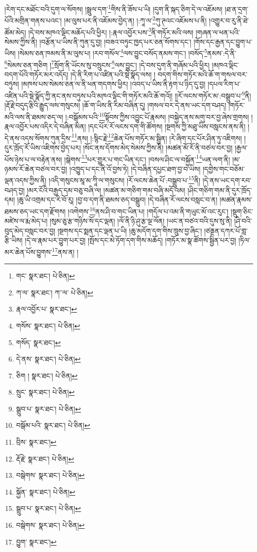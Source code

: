 །རེག་དང་མཐོང་བའི་དུག་ལ་སོགས། །སྦྲུལ་དག་\footnote{གང་  སྣར་ཐང་།  པེ་ཅིན། }གིས་ནི་ཟོས་པ་ཡི། །དུག་ནི་སྐད་ཅིག་དེ་ལ་འཇོམས། །ཐ་ན་དྲག་པོའི་མགྲིན་གནས་པའང་། །མ་ལུས་པར་ནི་འཇོམས་བྱེད་ན། །:ཀཱ་ལ་\footnote{ཀ་ལ་  སྣར་ཐང་། ཀ་་ལ་  པེ་ཅིན། }ཀུ་ཊའང་འཇོམས་པ་ནི། །འགྱུར་བ་རུ་ནི་ཐེ་ཚོམ་མེད། །དེ་བས་མཁའ་ལྡིང་མཆོད་པའི་ཕྱིར། །:རྣལ་འབྱོར་པས་\footnote{རྣལ་འབྱོར་པ་  སྣར་ཐང་། }ནི་གཏོར་མའི་ལས། །གཞན་ལ་ཕན་པའི་སེམས་ཀྱིས་ནི། །བརྩོན་པ་ཡིས་ནི་ཀུན་དུ་བྱ། །བཟའ་བཏུང་ཁྱད་པར་ཅན་སོགས་དང་། །གོས་དང་རྒྱན་དང་བྱུག་པ་ཡིས། །སེམས་ཅན་ཁམས་ནི་མ་ལུས་པ། །རབ་གསོལ་\footnote{གསོས་  སྣར་ཐང་།  པེ་ཅིན། }ལས་བྱུང་བསོད་ནམས་གང་། །བསོད་\footnote{གསོད་  སྣར་ཐང་། }ནམས་:དེ་ནི་\footnote{དེ་ནས་  སྣར་ཐང་།  པེ་ཅིན། }སེམས་ཅན་གཅིག །\footnote{ཅིག །  སྣར་ཐང་།  པེ་ཅིན། }སྲོག་ནི་ཡོངས་སུ་བསྲུངས་\footnote{སྲུང་  སྣར་ཐང་།  པེ་ཅིན། }ལས་བྱུང་། །དེ་བས་དུག་ནི་གཞོམ་པའི་ཕྱིར། །མཁའ་ལྡིང་བདག་པོའི་གཏོར་མར་འདོད། །དེ་ནི་རིག་པ་འཛིན་པའི་སྡེ་སྣོད་ལས། །
བདག་གིས་གཏོར་མའི་ཆོ་ག་གསལ་བར་བཏུས། །མཁས་པས་སེམས་ཅན་ལ་ནི་ཕན་གདགས་ཕྱིར། །འབད་པ་ཡིས་ནི་རྟག་པ་ཉིད་དུ་བྱ། །དཔལ་རིག་པ་འཛིན་པའི་སྡེ་སྣོད་ཀྱི་ནང་ནས་བཏུས་པའི་མཁའ་ལྡིང་གི་གཏོར་མའི་ཆོ་གའོ།། །།རོ་ལངས་གཏོར་མ་:བསྒྲུབ་པ་\footnote{སྒྲུབ་པ་  སྣར་ཐང་།  པེ་ཅིན། }ནི། །རྡོ་རྗེ་བདུད་རྩིའི་རྒྱུད་ལས་གསུངས། །ཆོ་ག་ཡིས་ནི་རིམ་བཞིན་དུ། །གསལ་བར་དེ་ནས་ཡང་དག་བཤད། །གཏོར་མའི་ལས་ནི་ཐམས་ཅད་ལ། །:བསྒོམས་པའི་\footnote{བསྒོམ་པའི་  སྣར་ཐང་།  པེ་ཅིན། }སྟོབས་ཀྱིས་འབྱུང་པོ་རྣམས། །བསྐྱེད་ནས་མགུ་བར་བྱ་ཞེས་གྲགས། །རྣལ་འབྱོར་པས་འདིར་དེ་བཞིན་མིན། །དང་པོར་རོ་ལངས་དག་གི་ཚོགས། །སྔགས་ཀྱི་མཐུ་ཡིས་བསླངས་ནས་ནི། །དེ་ནས་འདས་སོགས་ཀུན་དྲིས་\footnote{བྲིས་  སྣར་ཐང་། }ནས། །:སྙིང་རྗེ་\footnote{རྡོ་རྗེ་  སྣར་ཐང་།  པེ་ཅིན། }ཆེན་པོས་གཏོར་མ་སྦྱིན། །རེ་ཞིག་དང་པོར་ཤིན་ཏུ་འཇིགས། །དུར་ཁྲོད་རོ་ཡིས་འཇིགས་བྱེད་པར། །སོང་ནས་དོགས་མེད་སེམས་ཀྱིས་ནི། །མཚན་མོ་རོ་ནི་བཙལ་བར་བྱ། །རྒྱལ་པོས་ཉེས་པ་ལ་བརྟེན་ནས། །སྒེགས་\footnote{བསྒེགས་  སྣར་ཐང་།  པེ་ཅིན། }པར་གྱུར་པ་གང་ཡིན་དང་། །བསལ་ཤིང་ལ་བསྐྱོན་\footnote{སྐྱོན་  སྣར་ཐང་།  པེ་ཅིན། }ཡན་ལག་ནི། །མ་ཉམས་རོ་ཆེན་བཙལ་བར་བྱ། །འཁྱུད་པ་དང་ནི་འོ་བྱས་ཏེ། །དེ་བཞིན་དཔྱང་ཐག་བྱ་བ་ཡིས། །དགྱེས་གང་བཅོམ་ལྡན་འདས་ཀྱིས་ནི། །འདི་གསུངས་མཱ་མ་ཀཱི་ལ་གསུངས། །རོ་ལངས་ཆེན་པོ་:བསྒྲུབ་པ་\footnote{སྒྲུབ་པ་  སྣར་ཐང་།  པེ་ཅིན། }ནི། །དེ་ནས་ཡང་དག་རབ་བཤད་བྱ། །མར་ངོའི་བརྒྱད་དམ་བཅུ་བཞི་ལ། །མཚན་མ་གཅིག་གམ་བཞི་མདོ་འམ། །ཤིང་གཅིག་གམ་ནི་དུར་ཁྲོད་དམ། །ཆུ་ཡི་འགྲམ་དང་རི་བོ་རུ། །བྱ་བ་དག་ནི་ཐམས་ཅད་བསྒྲུབ། །དེ་བཞིན་རོ་ལངས་བསླང་བ་ན། །མཚན་རྣམས་ཐམས་ཅད་ཡང་དག་རྫོགས། །འགེགས་\footnote{བསྒེགས་  སྣར་ཐང་།  པེ་ཅིན། }ནས་ཤི་བ་གང་ཡིན་པ། །གདོལ་པ་འམ་ནི་གཡུང་མོ་འང་རུང་། །སྡུག་ཅིང་མཛེས་ལ་རྨ་མེད་པ། །སུམ་ཅུ་རྩ་གཉིས་སོ་དང་ལྡན། །ལོ་ནི་ཉི་ཤུ་རྩ་ལྔ་ལོན། །ཡང་ན་བཙའ་བའི་དུས་སུ་ནི། །ཤི་བའི་བུད་མེད་བསླང་བར་བྱ། །སྔགས་དང་སྨན་དང་ལྡན་པ་ཡི། །ཆུ་མདོག་དག་གིས་ཁྲུས་བྱ་ཞིང་། །ཙནྡན་དཀར་པོ་གླ་རྩི་ཡིས། །དེ་ལ་རྣམ་པར་བྱུག་པར་བྱ། །སྤོས་དང་མེ་ཏོག་དག་གིས་མཆོད། །གཏོར་མ་སྣ་ཚོགས་སྦྱིན་པར་བྱ། །ཏིལ་མར་ཆེན་པོས་བྱུགས་\footnote{བྱུག་  སྣར་ཐང་། }ནས་ན། །

